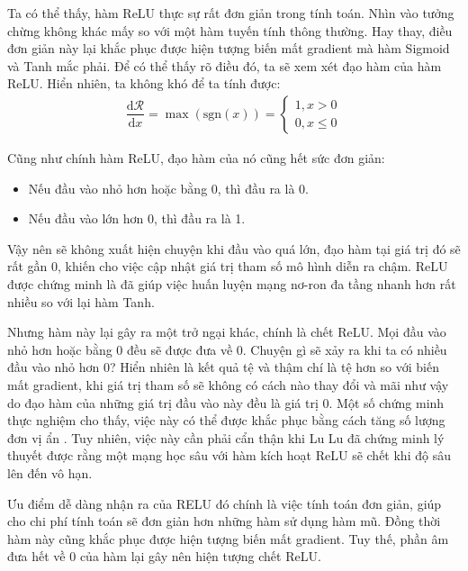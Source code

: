 Ta có thể thấy, hàm ReLU thực sự rất đơn giản trong tính toán.
Nhìn vào tưởng chừng không khác mấy so với một hàm tuyến tính thông thường.
Hay thay, điều đơn giản này lại khắc phục được hiện tượng biến mất gradient mà hàm Sigmoid và Tanh mắc phải.
Để có thể thấy rõ điều đó, ta sẽ xem xét đạo hàm của hàm ReLU.
Hiển nhiên, ta không khó để ta tính được:
\begin{align}
    \dfrac{\text{d}\mathcal{R}}{\text{d}x} = \max\left(\text{sgn}\left(x\right)\right) = \begin{cases}1, x > 0\\0, x \le 0\end{cases}
\end{align}

Cũng như chính hàm ReLU, đạo hàm của nó cũng hết sức đơn giản:
\begin{itemize}
    \item Nếu đầu vào nhỏ hơn hoặc bằng 0, thì đầu ra là 0.
    \item Nếu đầu vào lớn hơn 0, thì đầu ra là 1.
\end{itemize}

Vậy nên sẽ không xuất hiện chuyện khi đầu vào quá lớn, đạo hàm tại giá trị đó sẽ rất gần 0, khiến cho việc cập nhật giá trị tham số mô hình diễn ra chậm.
ReLU được chứng minh là đã giúp việc huấn luyện mạng nơ-ron đa tầng nhanh hơn rất nhiều so với lại hàm Tanh.
\vspace{5pt}

Nhưng hàm này lại gây ra một trở ngại khác, chính là chết ReLU.
Mọi đầu vào nhỏ hơn hoặc bằng 0 đều sẽ được đưa về 0.
Chuyện gì sẽ xảy ra khi ta có nhiều đầu vào nhỏ hơn 0?
Hiển nhiên là kết quả tệ và thậm chí là tệ hơn so với biến mất gradient, khi giá trị tham số sẽ không có cách nào thay đổi và mãi như vậy do đạo hàm của những giá trị đầu vào này đều là giá trị 0.
Một số chứng minh thực nghiệm cho thấy, việc này có thể được khắc phục bằng cách tăng số lượng đơn vị ẩn \cite{activationfunctionandrew}.
Tuy nhiên, việc này cần phải cẩn thận khi Lu Lu \cite{Lu_2020} đã chứng minh lý thuyết được rằng một mạng học sâu với hàm kích hoạt ReLU sẽ chết khi độ sâu lên đến vô hạn.
\vspace{5pt}

Ưu điểm dễ dàng nhận ra của RELU đó chính là việc tính toán đơn giản, giúp cho chi phí tính toán sẽ đơn giản hơn những hàm sử dụng hàm mũ.
Đồng thời hàm này cũng khắc phục được hiện tượng biến mất gradient.
Tuy thế, phần âm đưa hết về 0 của hàm lại gây nên hiện tượng chết ReLU.

